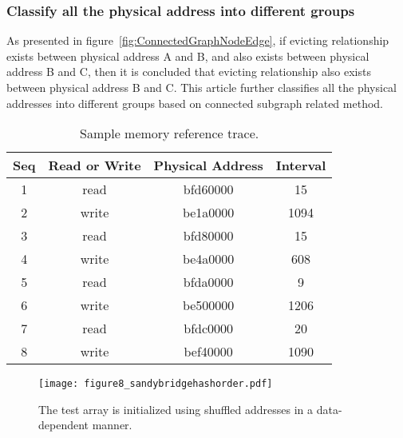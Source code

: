 \documentclass[conference]{IEEEtran}
\newcommand{\otoprule}{\midrule[\heavyrulewidth]}
\begin{document}
\subsubsection{Classify all the physical address into different groups}
As presented in figure~\ref{fig:ConnectedGraphNodeEdge}, if evicting relationship exists between physical address A and B, and also exists between physical address B and C, then it is concluded that evicting relationship also exists between physical address B and C. This article further classifies all the physical addresses into different groups based on connected subgraph related method. 
\clearpage
\begin{table}[!htbp]
\caption{Sample memory reference trace.}
\begin{center}
\begin{tabular}{cccc} 
\toprule
Seq	& Read or Write	&	Physical Address&	Interval \\ \otoprule
1	&	read	&	bfd60000	&	15	 \\ \midrule
2	&	write	&	be1a0000	&	1094	 \\ \midrule
3	&	read	&	bfd80000	&	15	 \\ \midrule
4	&	write	&	be4a0000	&	608	 \\ \midrule
5	&	read	&	bfda0000	&	9	 \\ \midrule
6	&	write	&	be500000	&	1206	 \\ \midrule
7	&	read	&	bfdc0000	&	20	 \\ \midrule
8	&	write	&	bef40000	&	1090	 \\ 
\bottomrule
\end{tabular}
\end{center}
\label{table:SampleMemoryReferenceTrace}
\end{table}
\begin{figure}[!htbp]
\centering
\texttt{[image: figure8\_sandybridgehashorder.pdf]}
\caption{The test array is initialized using shuffled addresses in a data-dependent manner.}
\label{fig:cyclicaccess}
\end{figure}
\end{document}
